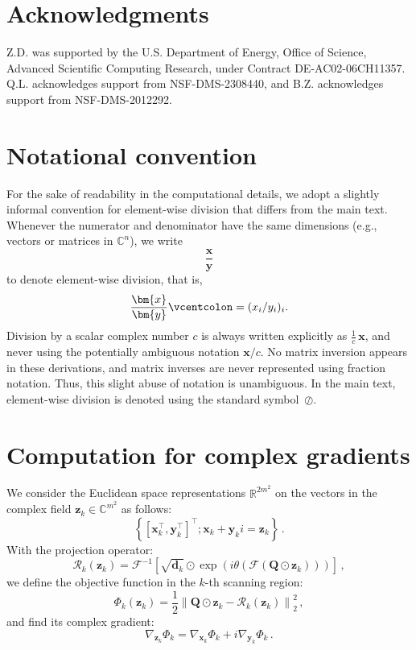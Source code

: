 \documentclass{article}
\numberwithin{equation}{section}
\newcommand{\defeq}{\vcentcolon=}
\begin{document}
\section{Acknowledgments}
Z.D. was supported by the U.S. Department of Energy, Office of Science, Advanced Scientific Computing Research, under Contract DE-AC02-06CH11357. Q.L. acknowledges support from NSF-DMS-2308440, and B.Z. acknowledges support from NSF-DMS-2012292.

 

\appendix
\section{Notational convention}

For the sake of readability in the computational details, we adopt a slightly
informal convention for element-wise division that differs from the main
text. Whenever the numerator and denominator have the same dimensions
(e.g., vectors or matrices in $\mathbb{C}^n$), we write
\[
    \frac{\bm{x}}{\bm{y}}
\]
to denote element-wise division, that is,
\[
    \frac{\bm{x}}{\bm{y}} \defeq (x_i / y_i)_i .
\]
Division by a scalar complex number $c$ is always written explicitly as
$\frac{1}{c}\,\bm{x}$, and never using the potentially ambiguous notation
$\bm{x}/c$. No matrix inversion appears in these derivations, and matrix
inverses are never represented using fraction notation. Thus, this slight
abuse of notation is unambiguous. In the main text, element-wise
division is denoted using the standard symbol~$\oslash$.

\section[Computation for the Misfit- and Surrogate-Derivative]{Computation for complex gradients}
We consider the Euclidean space representations $\mathbb{R}^{2m^2}$ on the vectors in the complex field $\bm{z}_k\in \mathbb{C}^{m^2}$ as follows:
\begin{equation*}
\left\{ [\bm{x}_k^\top, \bm{y}_k^\top]^\top ; \bm{x}_k + \bm{y}_k i = \bm{z}_k \right\}\,.
\end{equation*}
With the projection operator:
\begin{equation*}
    \mathcal{R}_k(\bm{z}_k) = \mathcal{F}^{-1}\left[\sqrt{\bm{d}_k} \odot \exp\left(i \theta(\mathcal{F}(\bm{Q}\odot \bm{z}_k))\right)\right]\,,
\end{equation*}
we define the objective function in the $k$-th scanning region:
\begin{equation*}
\Phi_k(\bm{z}_k) = \frac{1}{2} \left\|\bm{Q} \odot\bm{z}_k - \mathcal{R}_k(\bm{z}_k) \right\|_2^2\,,
\end{equation*}
and find its complex gradient:
\begin{equation*}
\nabla_{\bm{z}_k} \Phi_k = \nabla_{\bm{x}_k} \Phi_k + i\nabla_{\bm{y}_k} \Phi_k\,.
\end{equation*}
\end{document}
